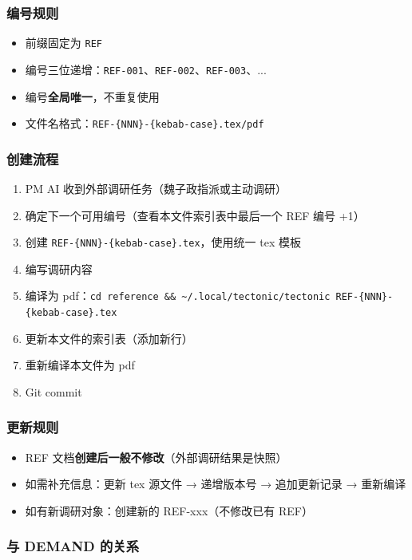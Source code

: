 \documentclass[11pt,a4paper]{article}
\begin{document}
\subsubsection{编号规则}

\begin{itemize}[nosep]
  \item 前缀固定为 \texttt{REF}
  \item 编号三位递增：\texttt{REF-001}、\texttt{REF-002}、\texttt{REF-003}、...
  \item 编号\textbf{全局唯一}，不重复使用
  \item 文件名格式：\texttt{REF-\{NNN\}-\{kebab-case\}.tex/pdf}
\end{itemize}

\subsubsection{创建流程}

\begin{enumerate}[nosep]
  \item PM AI 收到外部调研任务（魏子政指派或主动调研）
  \item 确定下一个可用编号（查看本文件索引表中最后一个 REF 编号 +1）
  \item 创建 \texttt{REF-\{NNN\}-\{kebab-case\}.tex}，使用统一 tex 模板
  \item 编写调研内容
  \item 编译为 pdf：\texttt{cd reference \&\& \textasciitilde/.local/tectonic/tectonic REF-\{NNN\}-\{kebab-case\}.tex}
  \item 更新本文件的索引表（添加新行）
  \item 重新编译本文件为 pdf
  \item Git commit
\end{enumerate}

\subsubsection{更新规则}

\begin{itemize}[nosep]
  \item REF 文档\textbf{创建后一般不修改}（外部调研结果是快照）
  \item 如需补充信息：更新 tex 源文件 → 递增版本号 → 追加更新记录 → 重新编译
  \item 如有新调研对象：创建新的 REF-xxx（不修改已有 REF）
\end{itemize}

\subsubsection{与 DEMAND 的关系}
\end{document}
